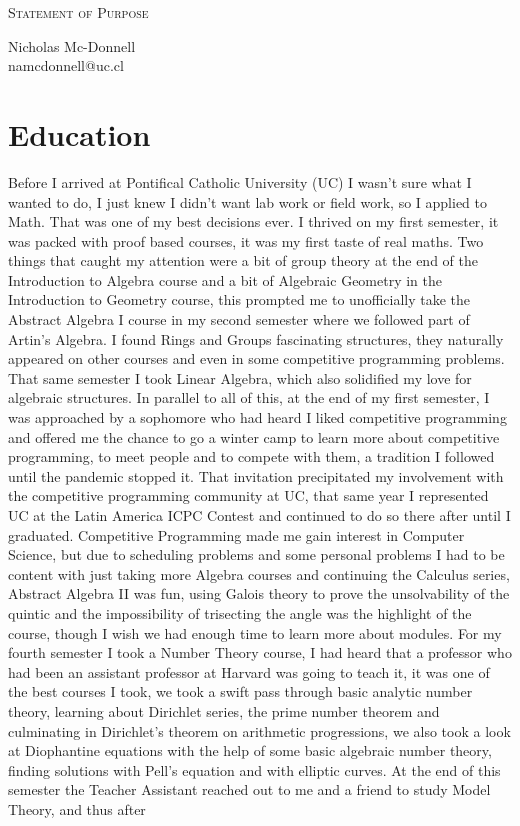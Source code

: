 \documentclass[letterpaper]{article}
\makeatletter
\newcommand{\soptitle}{Statement of Purpose}
\newcommand{\yourname}{Nicholas Mc-Donnell}
\newcommand{\youremail}{namcdonnell@uc.cl}
\newcommand{\amper}{{\fontspec[Scale=.95]{Adobe Caslon Pro}\selectfont\itshape\&~{}}}
\makeatother
\begin{document}
\begin{center}{\huge \scshape \soptitle}\end{center}
\begin{center}\vspace{0.2em} {\Large \yourname\\}
  {\youremail}\end{center}

\section*{Education}
Before I arrived at Pontifical Catholic University (UC) I wasn't sure what I wanted to do, I just knew I didn't want lab work or field work, so I applied to Math. That was one of my best decisions ever. I thrived on my first semester, it was packed with proof based courses, it was my first taste of real maths. Two things that caught my attention were a bit of group theory at the end of the Introduction to Algebra course and a bit of Algebraic Geometry in the Introduction to Geometry course, this prompted me to unofficially take the Abstract Algebra I course in my second semester where we followed part of Artin's Algebra. I found Rings and Groups fascinating structures, they naturally appeared on other courses and even in some competitive programming problems. That same semester I took Linear Algebra, which also solidified my love for algebraic structures. In parallel to all of this, at the end of my first semester, I was approached by a sophomore who had heard I liked competitive programming and offered me the chance to go a winter camp to learn more about competitive programming, to meet people and to compete with them, a tradition I followed until the pandemic stopped it. That invitation precipitated my involvement with the competitive programming community at UC, that same year I represented UC at the Latin America ICPC Contest and continued to do so there after until I graduated. Competitive Programming made me gain interest in Computer Science, but due to scheduling problems and some personal problems I had to be content with just taking more Algebra courses and continuing the Calculus series, Abstract Algebra II was fun, using Galois theory to prove the unsolvability of the quintic and the impossibility of trisecting the angle was the highlight of the course, though I wish we had enough time to learn more about modules. For my fourth semester I took a Number Theory course, I had heard that a professor who had been an assistant professor at Harvard was going to teach it, it was one of the best courses I took, we took a swift pass through basic analytic number theory, learning about Dirichlet series, the prime number theorem and culminating in Dirichlet's theorem on arithmetic progressions, we also took a look at Diophantine equations with the help of some basic algebraic number theory, finding solutions with Pell's equation and with elliptic curves. At the end of this semester the Teacher Assistant reached out to me and a friend to study Model Theory, and thus after 
\end{document}
